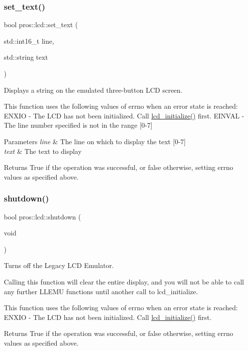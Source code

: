 \subsubsection{\texorpdfstring{set\+\_\+text()}{set\_text()}}
{\footnotesize\ttfamily bool pros\+::lcd\+::set\+\_\+text (\begin{DoxyParamCaption}\item[{std\+::int16\+\_\+t}]{line,  }\item[{std\+::string}]{text }\end{DoxyParamCaption})}

Displays a string on the emulated three-\/button L\+CD screen.

This function uses the following values of errno when an error state is reached\+: E\+N\+X\+IO -\/ The L\+CD has not been initialized. Call \hyperlink{llemu_8h_ae618494f080e95b506c0c18cb1ffb407}{lcd\+\_\+initialize()} first. E\+I\+N\+V\+AL -\/ The line number specified is not in the range \mbox{[}0-\/7\mbox{]}


\begin{DoxyParams}{Parameters}
{\em line} & The line on which to display the text \mbox{[}0-\/7\mbox{]} \\
\hline
{\em text} & The text to display\\
\hline
\end{DoxyParams}
\begin{DoxyReturn}{Returns}
True if the operation was successful, or false otherwise, setting errno values as specified above. 
\end{DoxyReturn}
\mbox{\label{namespacepros_1_1lcd_a7aa9a422049011de193f54bce8cc95ed}} 
\subsubsection{\texorpdfstring{shutdown()}{shutdown()}}
{\footnotesize\ttfamily bool pros\+::lcd\+::shutdown (\begin{DoxyParamCaption}\item[{void}]{ }\end{DoxyParamCaption})}

Turns off the Legacy L\+CD Emulator.

Calling this function will clear the entire display, and you will not be able to call any further L\+L\+E\+MU functions until another call to lcd\+\_\+initialize.

This function uses the following values of errno when an error state is reached\+: E\+N\+X\+IO -\/ The L\+CD has not been initialized. Call \hyperlink{llemu_8h_ae618494f080e95b506c0c18cb1ffb407}{lcd\+\_\+initialize()} first.

\begin{DoxyReturn}{Returns}
True if the operation was successful, or false otherwise, setting errno values as specified above. 
\end{DoxyReturn}
